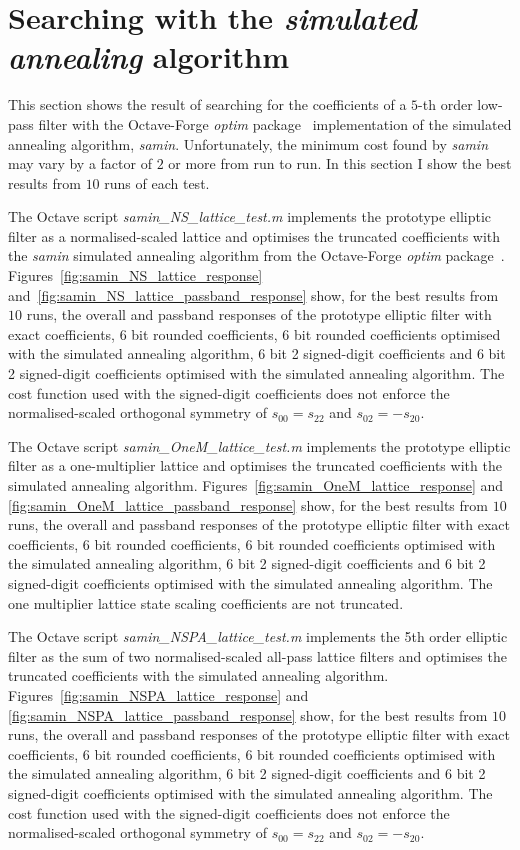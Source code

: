 \documentclass[a4paper,twoside,10pt,english]{report}
\begin{document}
\section{\label{sec:search-with-simulated-annealing}Searching with the \emph{simulated annealing} algorithm}
This section shows the result of searching for the coefficients of a $5$-th
order low-pass filter with the Octave-Forge \emph{optim} 
package~\cite{OctaveForge_OptimPackage} implementation of the simulated annealing
algorithm, \emph{samin}. Unfortunately, the minimum cost found by \emph{samin} 
may vary by a factor of $2$ or more from run to run. In this section I show the 
best results from $10$ runs of each test.

The Octave script \emph{samin\_NS\_lattice\_test.m} implements the prototype
elliptic filter as a normalised-scaled lattice and optimises the truncated
coefficients with the \emph{samin} simulated annealing algorithm from the
Octave-Forge \emph{optim} package~\cite{OctaveForge_OptimPackage}.
Figures~\ref{fig:samin_NS_lattice_response} 
and~\ref{fig:samin_NS_lattice_passband_response} show, for the best results from 
$10$ runs, the overall and passband responses of the prototype elliptic filter 
with exact coefficients, 6 bit rounded coefficients, 6 bit rounded coefficients 
optimised with the simulated annealing algorithm, 6 bit 2 signed-digit 
coefficients and 6 bit 2 signed-digit coefficients optimised with the simulated
annealing algorithm. The cost function used with the signed-digit coefficients
does not enforce the normalised-scaled orthogonal symmetry of $s_{00}=s_{22}$
and $s_{02}=-s_{20}$.

The Octave script \emph{samin\_OneM\_lattice\_test.m} implements the prototype
elliptic filter as a one-multiplier lattice and optimises the truncated
coefficients with the simulated annealing algorithm. 
Figures~\ref{fig:samin_OneM_lattice_response} and
\ref{fig:samin_OneM_lattice_passband_response} show, for the best results from
$10$ runs, the overall and passband responses of the prototype elliptic filter 
with exact coefficients, 6 bit rounded coefficients, 6 bit rounded coefficients 
optimised with the simulated annealing algorithm, 6 bit 2 signed-digit 
coefficients and 6 bit 2 signed-digit coefficients optimised with the simulated
annealing algorithm. The one multiplier lattice state scaling coefficients are
not truncated.

The Octave script \emph{samin\_NSPA\_lattice\_test.m} implements the 5th order 
elliptic filter as the sum of two normalised-scaled all-pass lattice filters and 
optimises the truncated coefficients with the simulated annealing algorithm. 
Figures~\ref{fig:samin_NSPA_lattice_response} and
\ref{fig:samin_NSPA_lattice_passband_response} show, for the best results from
$10$ runs, the overall and passband responses of the prototype elliptic filter 
with exact coefficients, 6 bit rounded coefficients, 6 bit rounded coefficients 
optimised with the simulated annealing algorithm, 6 bit 2 signed-digit 
coefficients and 6 bit 2 signed-digit coefficients optimised with the simulated
annealing algorithm. The cost function used with the signed-digit coefficients
does not enforce the normalised-scaled orthogonal symmetry of $s_{00}=s_{22}$
and $s_{02}=-s_{20}$.
\end{document}
